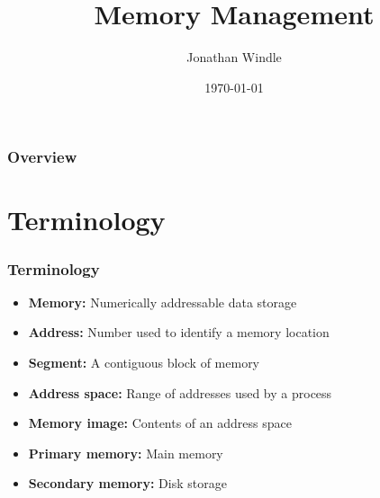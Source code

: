 \documentclass{beamer}
\title[Memory Management]{Memory Management} %
\author{Jonathan Windle} %
\institute[UEA] %
{
University of East Anglia \\ %
\medskip
\textit{J.Windle@uea.ac.uk} %
}
\date{\today} %
\begin{document}
\begin{frame}
\titlepage %
\end{frame}

\begin{frame}[allowframebreaks]
\frametitle{Overview} %
\tableofcontents %
\end{frame}

\section{Terminology}
\begin{frame}
\frametitle{Terminology}
\begin{itemize}
\item \textbf{Memory:} Numerically addressable data storage
\item \textbf{Address:} Number used to identify a memory location
\item \textbf{Segment:} A contiguous block of memory
\item \textbf{Address space:} Range of addresses used by a process
\item \textbf{Memory image:} Contents of an address space
\item \textbf{Primary memory:} Main memory
\item \textbf{Secondary memory:} Disk storage
\end{itemize}
\end{frame}
\end{document}
